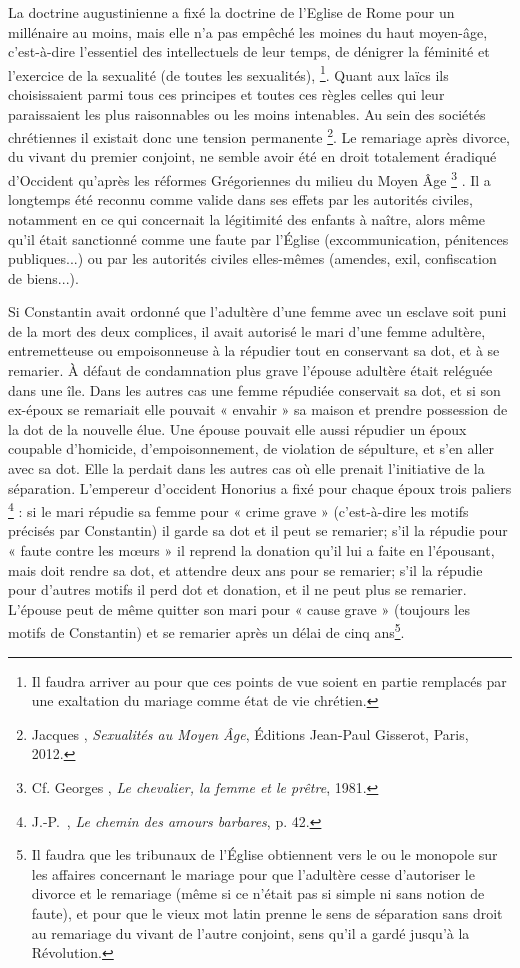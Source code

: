 La doctrine augustinienne a fixé la doctrine de l'Eglise de Rome pour un millénaire au moins, mais elle n'a pas empêché les moines du haut moyen-âge, c'est-à-dire l'essentiel des intellectuels de leur temps, de dénigrer la féminité et l'exercice de la sexualité (de toutes les sexualités), \footnote{Il faudra arriver au  pour que ces points de vue soient en partie remplacés par une exaltation du mariage comme état de vie chrétien. }. Quant aux laïcs ils choisissaient parmi tous ces principes et toutes ces règles celles qui leur paraissaient les plus raisonnables ou les moins intenables. Au sein des sociétés chrétiennes il existait donc une tension permanente
\footnote{Jacques , \emph{Sexualités au Moyen Âge}, Éditions Jean-Paul Gisserot, Paris, 2012.}. Le remariage après divorce, du vivant du premier conjoint, ne semble avoir été en droit totalement éradiqué d'Occident qu'après les réformes Grégoriennes du milieu du Moyen Âge
\footnote{Cf. Georges , \emph{Le chevalier, la femme et le prêtre}, 1981.}%
. Il a longtemps été reconnu comme valide dans ses effets par les autorités civiles, notamment en ce qui concernait la légitimité des enfants à naître, alors même qu'il était sanctionné comme une faute par l'Église (excommunication, pénitences publiques...) ou par les autorités civiles elles-mêmes (amendes, exil, confiscation de biens...).  

 Si Constantin avait ordonné que l'adultère d'une femme avec un esclave soit puni de la mort des deux complices, il avait autorisé le mari d'une femme adultère, entremetteuse ou empoisonneuse à la répudier tout en conservant sa dot, et à se remarier. À défaut de condamnation plus grave l'épouse adultère était reléguée dans une île. Dans les autres cas une femme répudiée conservait sa dot, et si son ex-époux se remariait elle pouvait « envahir » sa maison et prendre possession de la dot de la nouvelle élue. Une épouse pouvait elle aussi répudier un époux coupable d'homicide, d'empoisonnement, de violation de sépulture, et s'en aller avec sa dot. Elle la perdait dans les autres cas où elle prenait l'initiative de la séparation. L'empereur d'occident Honorius a fixé pour chaque époux trois paliers
\footnote{J.-P.~, \emph{Le chemin des amours barbares}, p. 42.}%
: si le mari répudie sa femme pour « crime grave » (c'est-à-dire les motifs précisés par Constantin) il garde sa dot et il peut se remarier; s'il la répudie pour « faute contre les mœurs » il reprend la donation qu'il lui a faite en l'épousant, mais doit rendre sa dot, et attendre deux ans pour se remarier; s'il la répudie pour d'autres motifs il perd dot et donation, et il ne peut plus se remarier. L'épouse peut de même quitter son mari pour « cause grave » (toujours les motifs de Constantin) et se remarier après un délai de cinq ans\footnote{Il faudra que les tribunaux de l'Église obtiennent vers le \ieme{} ou  le monopole sur les affaires concernant le mariage pour que l'adultère cesse d'autoriser le divorce et le remariage (même si ce n'était pas si simple ni sans notion de faute), et pour que le vieux mot latin  prenne le sens de séparation sans droit au remariage du vivant de l'autre conjoint, sens qu'il a gardé jusqu'à la Révolution.}. 
 
